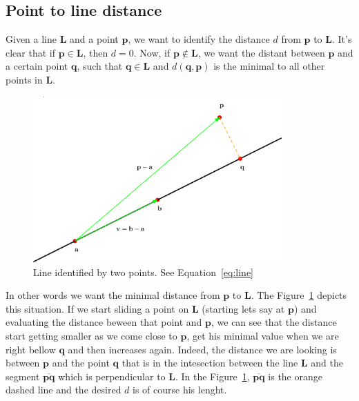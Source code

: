 \subsection{Point to line distance}

Given a line $\mathbf{L}$ and a point $\mathbf{p}$, we want to identify the distance $d$ from $\mathbf{p}$ to $\mathbf{L}$.
It's clear that if $\mathbf{p} \in \mathbf{L}$, then $d = 0$.
Now, if $\mathbf{p} \notin \mathbf{L}$, we want the distant between $\mathbf{p}$ and a certain point $\mathbf{q}$, such that $\mathbf{q} \in \mathbf{L}$ and $d(\mathbf{q}, \mathbf{p})$ is the minimal to all other points in $\mathbf{L}$.

\begin{figure}[htb]
  \centering
  \includegraphics[width=0.85\textwidth]{img/line2point}
  \caption{Line identified by two points. See Equation~\ref{eq:line} }
  \label{fig:point2line}
\end{figure}

In other words we want the minimal distance from $\mathbf{p}$ to $\mathbf{L}$.
The Figure~\ref{fig:point2line} depicts this situation.
If we start sliding a point on $\mathbf{L}$ (starting lets say at $\mathbf{p}$) and evaluating the distance beween that point and $\mathbf{p}$, we can see that the distance start getting smaller as we come close to $\mathbf{p}$, get his minimal value when we are right bellow $\mathbf{q}$ and then increases again. 
Indeed, the distance we are looking is between $\mathbf{p}$ and the point $\mathbf{q}$ that is in the intesection between the line $\mathbf{L}$ and the segment $\overline{\mathbf{p} \mathbf{q}}$ which is perpendicular to $\mathbf{L}$.
In the Figure~\ref{fig:point2line}, $\overline{\mathbf{p} \mathbf{q}}$ is the orange dashed line and the desired $d$ is of course his lenght.

